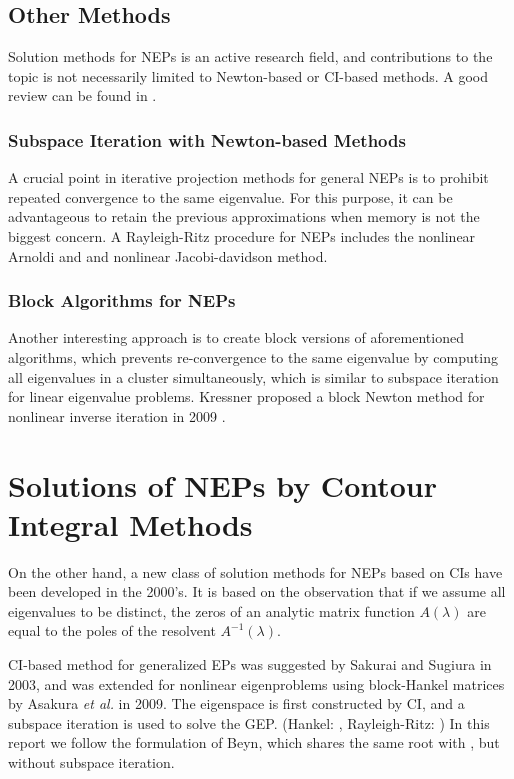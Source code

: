 \documentclass[11pt,letterpaper]{article}
\begin{document}
\subsection{Other Methods}
Solution methods for NEPs is an active research field, and contributions to the topic is not necessarily limited to Newton-based or CI-based methods. A good review can be found in \citep{effenberger_robust_2013}. 
\subsubsection{Subspace Iteration with Newton-based Methods}
A crucial point in iterative projection methods for general NEPs is to  prohibit repeated convergence to  the same eigenvalue. For this purpose, it can be advantageous to retain the previous approximations when memory is not the biggest concern. A Rayleigh-Ritz procedure for NEPs includes the nonlinear Arnoldi and \citep{voss2004arnoldi} and nonlinear Jacobi-davidson \citep{mehrmann2004nonlinear, voss2007jacobi} method. 
\subsubsection{Block Algorithms for NEPs}
Another interesting approach is to create block versions of aforementioned algorithms, which prevents re-convergence to the same eigenvalue by computing all eigenvalues in a cluster simultaneously, which is similar to subspace iteration for linear eigenvalue problems. Kressner proposed a block Newton method for nonlinear inverse iteration in 2009 \citep{kressner2009block}. 
\section{Solutions of NEPs by Contour Integral Methods}
On the other hand, a new class of solution methods for NEPs based on CIs have been developed in the 2000's. It is based on the observation that if we assume all eigenvalues to be distinct, the zeros of an analytic matrix function $A(\lambda)$ are equal to the poles of the resolvent $A^{-1}(\lambda)$. 

CI-based method for generalized EPs was suggested by Sakurai and Sugiura in 2003, \citep{sakurai2003projection} and was extended for nonlinear eigenproblems using block-Hankel matrices by Asakura {\it et al.} in 2009. \citep{asakura_numerical_2009} The eigenspace is first constructed by CI, and a subspace iteration is used to solve the GEP. (Hankel: \citep{asakura_numerical_2009}, Rayleigh-Ritz: \citep{yokota_projection_2013}) In this report we follow the formulation of Beyn\citep{beyn_integral_2012}, which shares the same root with \citep{asakura_numerical_2009, sakurai_efficient_2013}, but without subspace iteration. 
\end{document}
